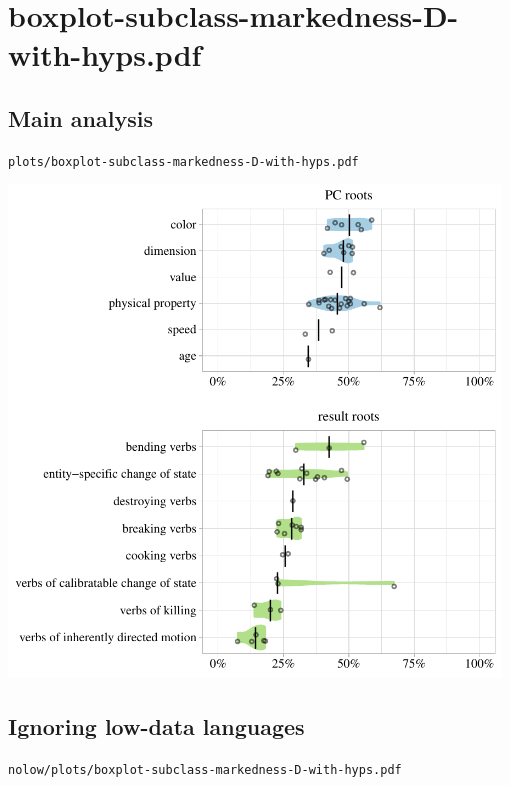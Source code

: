 \eject

\section{boxplot-subclass-markedness-D-with-hyps.pdf}

\subsection{Main analysis}

\texttt{plots/boxplot-subclass-markedness-D-with-hyps.pdf}

\includegraphics[width=0.98\textwidth]{../plots/boxplot-subclass-markedness-D-with-hyps.pdf}

\subsection{Ignoring low-data languages}

\texttt{nolow/plots/boxplot-subclass-markedness-D-with-hyps.pdf}

